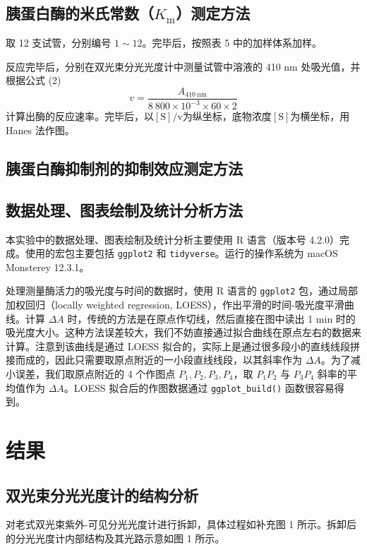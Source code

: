 \documentclass[11pt,UTF8]{ctexart}
\begin{document}
    \subsection{胰蛋白酶的米氏常数（\(K_\mathrm{m}\)）测定方法}
    取 12 支试管，分别编号 \(1 \sim 12\)。完毕后，按照表 5 中的加样体系加样。

    反应完毕后，分别在双光束分光光度计中测量试管中溶液的 410 nm 处吸光值，并根据公式 (2)
    \begin{equation}
        v=\frac{A_\mathrm{410\ nm}}{8\ 800\times 10^{-3}\times 60\times 2}
    \end{equation}    
    计算出酶的反应速率。完毕后，以\(\mathrm{[S]/v}\)为纵坐标，底物浓度\(\mathrm{[S]}\)为横坐标，用 Hanes 法作图。

    \subsection{胰蛋白酶抑制剂的抑制效应测定方法}
    

    \subsection{数据处理、图表绘制及统计分析方法}
    本实验中的数据处理、图表绘制及统计分析主要使用 R 语言（版本号 4.2.0）完成。使用的宏包主要包括 \texttt{ggplot2} 和 \texttt{tidyverse}。运行的操作系统为 macOS Monsterey 12.3.1。

    处理测量酶活力的吸光度与时间的数据时，使用 R 语言的 \texttt{ggplot2} 包，通过局部加权回归（locally weighted regression, LOESS），作出平滑的时间-吸光度平滑曲线。计算 \(\Delta A\) 时，传统的方法是在原点作切线，然后直接在图中读出 1 min 时的吸光度大小。这种方法误差较大，我们不妨直接通过拟合曲线在原点左右的数据来计算。注意到该曲线是通过 LOESS 拟合的，实际上是通过很多段小的直线线段拼接而成的，因此只需要取原点附近的一小段直线线段，以其斜率作为 \(\Delta A\)。为了减小误差，我们取原点附近的 4 个作图点 \(P_1, P_2, P_3, P_4\)，取 \(P_1P_2\) 与 \(P_3P_4\) 斜率的平均值作为 \(\Delta A\)。LOESS 拟合后的作图数据通过 \texttt{ggplot\_build()} 函数很容易得到。

    \section{结果}
    \subsection{双光束分光光度计的结构分析}
    对老式双光束紫外-可见分光光度计进行拆卸，具体过程如补充图 1 所示。拆卸后的分光光度计内部结构及其光路示意如图 1 所示。
    
\end{document}
